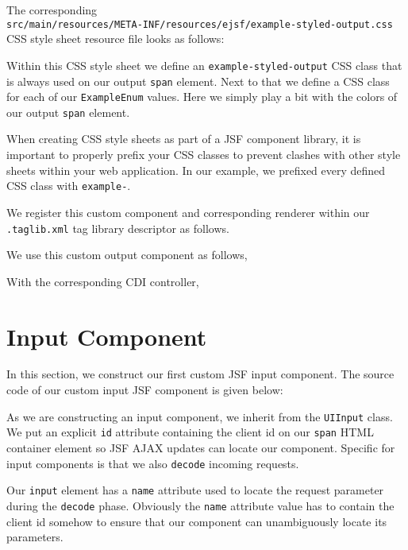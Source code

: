 The corresponding\\
\texttt{src/main/resources/META-INF/resources/ejsf/example-styled-output.css}\\
CSS style sheet resource file looks as follows:

Within this CSS style sheet we define an \texttt{example-styled-output} CSS class that is always used on our output \texttt{span} element.
Next to that we define a CSS class for each of our \texttt{ExampleEnum} values.
Here we simply play a bit with the colors of our output \texttt{span} element.

When creating CSS style sheets as part of a JSF component library, it is important to properly prefix your CSS classes to prevent clashes with other style sheets within your web application.
In our example, we prefixed every defined CSS class with \texttt{example-}.

We register this custom component and corresponding renderer within our \texttt{.taglib\allowbreak.xml} tag library descriptor as follows.


We use this custom output component as follows,


With the corresponding CDI controller,



\section{Input Component}
In this section, we construct our first custom JSF input component.
The source code of our custom input JSF component is given below:

As we are constructing an input component, we inherit from the \texttt{UIInput} class.
We put an explicit \texttt{id} attribute containing the client id on our \texttt{span} HTML container element so JSF AJAX updates can locate our component.
Specific for input components is that we also \texttt{decode} incoming requests.

Our \texttt{input} element has a \texttt{name} attribute used to locate the request parameter during the \texttt{decode} phase.
Obviously the \texttt{name} attribute value has to contain the client id somehow to ensure that our component can unambiguously locate its parameters.

